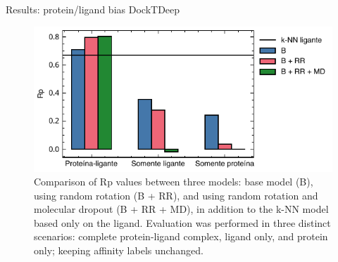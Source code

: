 \documentclass[aspectratio=169,xcolor=dvipsnames]{beamer}
\begin{document}
\begin{frame}{Results: protein/ligand bias \hfill {\footnotesize \alert{DockTDeep}}}
    \begin{figure}
        \centering
        \includegraphics[width=0.7\linewidth]{imgs/results/ligand-bias.pdf}
        \caption{Comparison of Rp values between three models: base model (B), using random rotation (B + RR), and using random rotation and molecular dropout (B + RR + MD), in addition to the k-NN model based only on the ligand. Evaluation was performed in three distinct scenarios: complete protein-ligand complex, ligand only, and protein only; keeping affinity labels unchanged.}
    \end{figure}
\end{frame}
\end{document}
